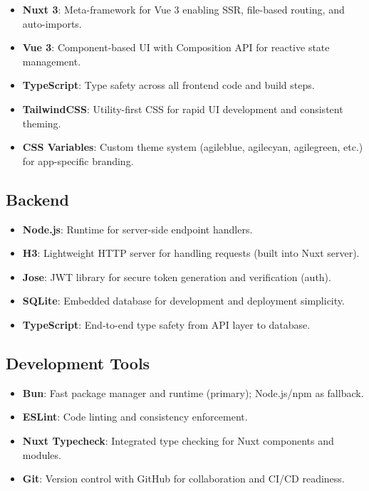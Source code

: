 \documentclass[12pt,a4paper]{article}
\begin{document}
\begin{itemize}
\item \textbf{Nuxt 3}: Meta-framework for Vue 3 enabling SSR, file-based routing, and auto-imports.
\item \textbf{Vue 3}: Component-based UI with Composition API for reactive state management.
\item \textbf{TypeScript}: Type safety across all frontend code and build steps.
\item \textbf{TailwindCSS}: Utility-first CSS for rapid UI development and consistent theming.
\item \textbf{CSS Variables}: Custom theme system (agileblue, agilecyan, agilegreen, etc.) for app-specific branding.
\end{itemize}

\subsection{Backend}

\begin{itemize}
\item \textbf{Node.js}: Runtime for server-side endpoint handlers.
\item \textbf{H3}: Lightweight HTTP server for handling requests (built into Nuxt server).
\item \textbf{Jose}: JWT library for secure token generation and verification (auth).
\item \textbf{SQLite}: Embedded database for development and deployment simplicity.
\item \textbf{TypeScript}: End-to-end type safety from API layer to database.
\end{itemize}

\subsection{Development Tools}

\begin{itemize}
\item \textbf{Bun}: Fast package manager and runtime (primary); Node.js/npm as fallback.
\item \textbf{ESLint}: Code linting and consistency enforcement.
\item \textbf{Nuxt Typecheck}: Integrated type checking for Nuxt components and modules.
\item \textbf{Git}: Version control with GitHub for collaboration and CI/CD readiness.
\end{itemize}
\end{document}
